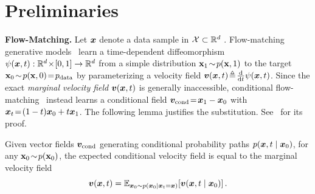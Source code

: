 %
%
\section{Preliminaries}
\label{sec: preliminary}

\noindent\textbf{Flow-Matching.} Let ${\bm{x}}$ denote a data sample in ${\mathcal{X}}\subset\mathbb{R}^{d}$ . Flow-matching generative models~\cite{lipman2023flowmatchinggenerativemodeling,tong2024improvinggeneralizingflowbasedgenerative} learn a time-dependent diffeomorphism $\psi({\bm{x}},t):\mathbb{R}^{d}\!\times\![0,1]\to\mathbb{R}^{d}$ from a simple distribution ${\mathbf{x}}_{1}\!\sim\!{p}({\mathbf{x}},1)$ to the target ${\mathbf{x}}_{0}\!\sim\!{p}({\mathbf{x}},0)\!=\!p_{\rm{data}}$ by parameterizing a velocity field ${\bm{v}}({\bm{x}},t)\!\triangleq\!\frac{\mathrm{d}}{\mathrm{d}t}\psi({\bm{x}},t)$. Since the exact \textit{marginal velocity field} ${\bm{v}}({\bm{x}},t)$ is generally inaccessible, conditional flow-matching~\cite{lipman2023flowmatchinggenerativemodeling} instead learns a conditional field ${\bm{v}}_{\text{cond}}\!=\!{\bm{x}}_{1}-{\bm{x}}_{0}$ with ${\bm{x}}_{t}\!=\!(1-t){\bm{x}}_{0}+t{\bm{x}}_{1}$. The following lemma justifies the substitution. See~ for its proof.
\begin{lemma}
    Given vector fields ${\bm{v}}_{\text{cond}}$ generating conditional probability paths $p({\bm{x}},t\mid{\bm{x}}_{0})$, for any ${\mathbf{x}}_{0}\!\sim\!p({\mathbf{x}}_{0})$, the expected conditional velocity field is equal to the marginal velocity field
    \begin{equation}
        {\bm{v}}({\bm{x}},t)=\mathbb{E}_{{\bm{x}}_{0}\sim{p({\bm{x}}_{0}\mid{\bm{x}}_{t}={\bm{x}})}}\!\left[{\bm{v}}({\bm{x}},t\mid{\bm{x}}_{0})\right].
        \label{eq: margv-condv-relation}
    \end{equation}
\end{lemma}

